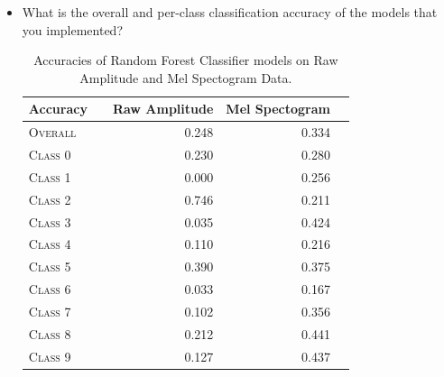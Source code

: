 \documentclass[11pt]{article}
\begin{document}
\begin{itemize}
\item  What is the overall and per-class classification accuracy of the models that you implemented?
    \begin{table}[h]
    \centering
    \begin{tabular}{llrrr}
        \toprule
        Accuracy &  & Raw Amplitude & Mel Spectogram \\
        \midrule
        \textsc{Overall} & & 0.248 & 0.334 \\
        \textsc{Class 0} & & 0.230 & 0.280 \\
        \textsc{Class 1} & & 0.000 & 0.256 \\
        \textsc{Class 2} & & 0.746 & 0.211 \\
        \textsc{Class 3} & & 0.035 & 0.424 \\
        \textsc{Class 4} & & 0.110 & 0.216 \\
        \textsc{Class 5} & & 0.390 & 0.375 \\
        \textsc{Class 6} & & 0.033 & 0.167 \\
        \textsc{Class 7} & & 0.102 & 0.356 \\
        \textsc{Class 8} & & 0.212 & 0.441 \\
        \textsc{Class 9} & & 0.127 & 0.437 \\
        \bottomrule
    \end{tabular}
    \caption{\label{tab:lr_results} Accuracies of Random Forest Classifier models on Raw Amplitude and Mel Spectogram Data.}
    \end{table}


\end{itemize}
\end{document}
